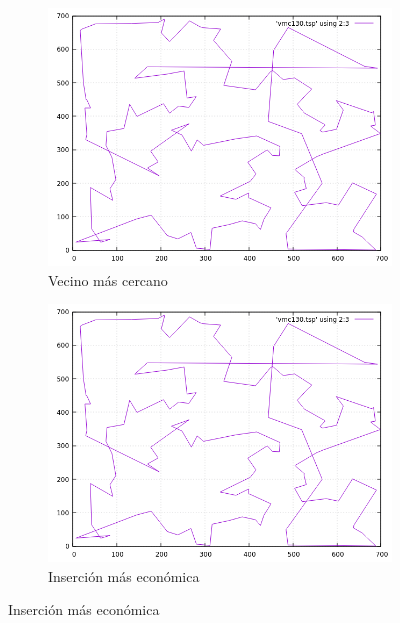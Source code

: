 \documentclass[12pt,spanish]{article}
\begin{document}
\begin{figure}[H]
\centering
\begin{subfigure}[b]{0.36\textwidth}
\includegraphics[width=\textwidth]{ch130_vmc.png}
\caption{Vecino más cercano}
\end{subfigure}
\quad
\begin{subfigure}[b]{0.36\textwidth}
\includegraphics[width=\textwidth]{ch130_vmc.png}
\caption{Inserción más económica}
\end{subfigure}

\vspace{1cm}


\end{figure}
\end{document}
